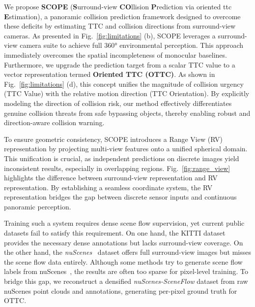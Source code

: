 \documentclass[journal]{IEEEtran}
\begin{document}
We propose \textbf{SCOPE} (\textbf{S}urround-view \textbf{CO}llision \textbf{P}rediction via oriented ttc \textbf{E}stimation), a panoramic collision prediction framework designed to overcome these deficits by estimating TTC and collision directions from surround-view cameras. As presented in Fig.~\ref{fig:limitations} (b), SCOPE leverages a surround-view camera suite to achieve full 360° environmental perception. This approach immediately overcomes the spatial incompleteness of monocular baselines. Furthermore, we upgrade the prediction target from a scalar TTC value to a vector representation termed \textbf{Oriented TTC (OTTC)}. As shown in Fig.~\ref{fig:limitations} (d), this concept unifies the magnitude of collision urgency (TTC Value) with the relative motion direction (TTC Orientation). By explicitly modeling the direction of collision risk, our method effectively differentiates genuine collision threats from safe bypassing objects, thereby enabling robust and direction-aware collision warning.

To ensure geometric consistency, SCOPE introduces a Range View (RV) representation by projecting multi-view features onto a unified spherical domain. This unification is crucial, as independent predictions on discrete images yield inconsistent results, especially in overlapping regions. Fig.~\ref{fig:range_view} highlights the difference between surround-view representation and RV representation. By establishing a seamless coordinate system, the RV representation bridges the gap between discrete sensor inputs and continuous panoramic perception.

Training such a system requires dense scene flow supervision, yet current public datasets fail to satisfy this requirement. On one hand, the KITTI dataset~\cite{Menze2015CVPR} provides the necessary dense annotations but lacks surround-view coverage. On the other hand, the \textit{nuScenes}~\cite{caesar2020nusc} dataset offers full surround-view images but misses the scene flow data entirely. Although some methods try to generate scene flow labels from nuScenes~\cite{hur2020self, jiang20243dsflabelling}, the results are often too sparse for pixel-level training. To bridge this gap, we reconstruct a densified \textit{nuScenes-SceneFlow} dataset from raw nuScenes point clouds and annotations, generating per-pixel ground truth for OTTC.

\end{document}
